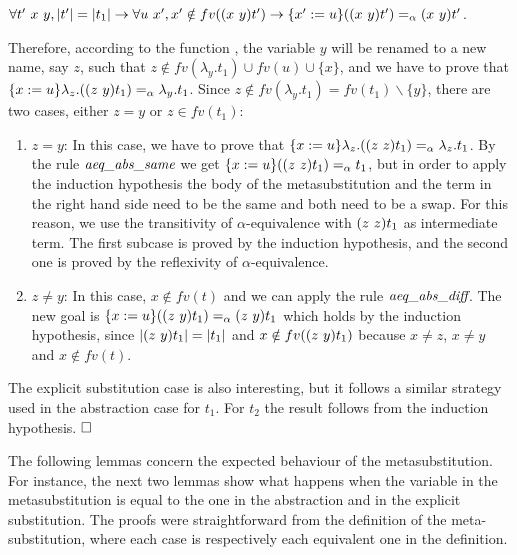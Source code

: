 $\forall t'\ x\ y, |t'| = |t_1| \to \forall u\ x', x' \notin fv(\swap{x}{y}{t'}) \to \metasub{(\swap{x}{y}{t'})}{x'}{u} =_\alpha \swap{x}{y}{t'}$.
\begin{coqdoccode}
\end{coqdoccode}
Therefore, according to the function , the variable $y$ will be renamed to a new name, say $z$, such that $z \notin fv(\lambda_y.t_1) \cup fv(u) \cup \{x\}$, and we have to prove that $\metasub{\lambda_z.(\swap{z}{y}{t_1})}{x}{u} =_\alpha \lambda_y.t_1$. Since $z \notin fv(\lambda_y.t_1) = fv(t_1)\backslash \{y\}$, there are two cases, either $z = y$ or $z \in fv(t_1)$:
\begin{coqdoccode}
\end{coqdoccode}
\begin{enumerate}
   \item $z = y$: In this case, we have to prove that $\metasub{\lambda_z.(\swap{z}{z}{t_1})}{x}{u} =_\alpha \lambda_z.t_1$. By the rule $\mbox{\it aeq}\_\mbox{\it abs}\_\mbox{\it same}$ we get $\metasub{(\swap{z}{z}{t_1})}{x}{u} =_\alpha t_1$, but in order to apply the induction hypothesis the body of the metasubstitution and the term in the right hand side need to be the same and both need to be a swap. For this reason, we use the transitivity of $\alpha$-equivalence with $\swap{z}{z}{t_1}$ as intermediate term. The first subcase is proved by the induction hypothesis, and the second one is proved by the reflexivity of $\alpha$-equivalence.
\item $z \neq y$: In this case, $x \notin fv(t)$ and we can apply the rule $\mbox{\it aeq}\_\mbox{\it abs}\_\mbox{\it diff}$. The new goal is $\metasub{(\swap{z}{y}{t_1})}{x}{u} =_\alpha \swap{z}{y}{t_1}$ which holds by the induction hypothesis, since $|\swap{z}{y}{t_1}| = |t_1|$ and $x \notin fv(\swap{z}{y}{t_1})$ because $x \neq z$, $x \neq y$ and $x \notin fv(t)$.
  \end{enumerate}
\begin{coqdoccode}
\end{coqdoccode}
The explicit substitution case is also interesting, but it follows a similar strategy used in the abstraction case for $t_1$. For $t_2$ the result follows from the induction hypothesis. $\hfill\Box$ 
\begin{coqdoccode}
\coqdocemptyline
\coqdocemptyline
\end{coqdoccode}
The following lemmas concern the expected behaviour of the metasubstitution. For instance, the next two lemmas show what happens when the variable in the metasubstitution is equal to the one in the abstraction and in the explicit substitution.  The proofs were straightforward from the definition of the meta-substitution, where each case is respectively each equivalent one in the definition. \newline
